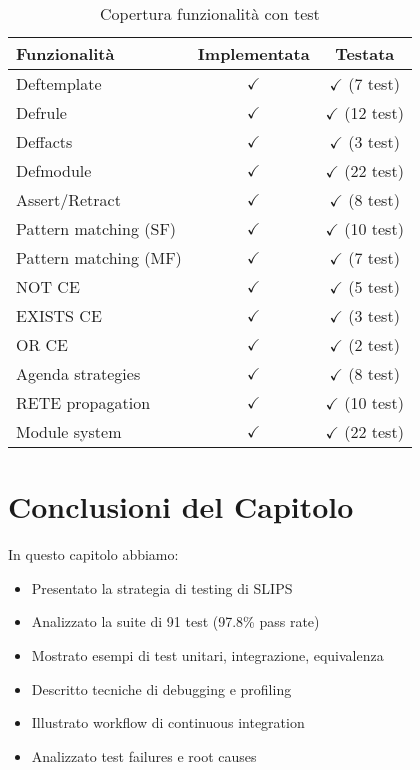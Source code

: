 \begin{table}[h]
\centering
\begin{tabular}{@{}lcc@{}}
\toprule
\textbf{Funzionalità} & \textbf{Implementata} & \textbf{Testata} \\
\midrule
Deftemplate & $\checkmark$ & $\checkmark$ (7 test) \\
Defrule & $\checkmark$ & $\checkmark$ (12 test) \\
Deffacts & $\checkmark$ & $\checkmark$ (3 test) \\
Defmodule & $\checkmark$ & $\checkmark$ (22 test) \\
Assert/Retract & $\checkmark$ & $\checkmark$ (8 test) \\
Pattern matching (SF) & $\checkmark$ & $\checkmark$ (10 test) \\
Pattern matching (MF) & $\checkmark$ & $\checkmark$ (7 test) \\
NOT CE & $\checkmark$ & $\checkmark$ (5 test) \\
EXISTS CE & $\checkmark$ & $\checkmark$ (3 test) \\
OR CE & $\checkmark$ & $\checkmark$ (2 test) \\
Agenda strategies & $\checkmark$ & $\checkmark$ (8 test) \\
RETE propagation & $\checkmark$ & $\checkmark$ (10 test) \\
Module system & $\checkmark$ & $\checkmark$ (22 test) \\
\bottomrule
\end{tabular}
\caption{Copertura funzionalità con test}
\label{tab:feature_coverage}
\end{table}

\section{Conclusioni del Capitolo}

In questo capitolo abbiamo:

\begin{itemize}
\item Presentato la strategia di testing di SLIPS
\item Analizzato la suite di 91 test (97.8\% pass rate)
\item Mostrato esempi di test unitari, integrazione, equivalenza
\item Descritto tecniche di debugging e profiling
\item Illustrato workflow di continuous integration
\item Analizzato test failures e root causes
\end{itemize}

